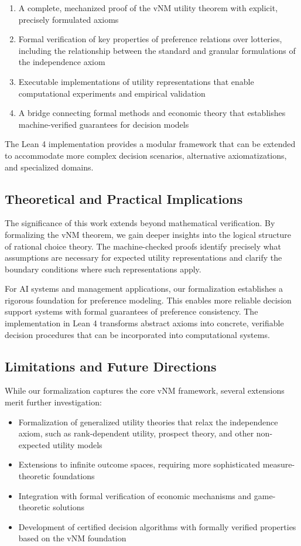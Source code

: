 \documentclass{article}
\theoremstyle{definition}
\begin{document}
\begin{enumerate}
    \item A complete, mechanized proof of the vNM utility theorem with explicit, precisely formulated axioms
    \item Formal verification of key properties of preference relations over lotteries, including the relationship between the standard and granular formulations of the independence axiom
    \item Executable implementations of utility representations that enable computational experiments and empirical validation
    \item A bridge connecting formal methods and economic theory that establishes machine-verified guarantees for decision models
\end{enumerate}

The Lean 4 implementation provides a modular framework that can be extended to accommodate more complex decision scenarios, alternative axiomatizations, and specialized domains.

\subsection{Theoretical and Practical Implications}

The significance of this work extends beyond mathematical verification. By formalizing the vNM theorem, we gain deeper insights into the logical structure of rational choice theory. The machine-checked proofs identify precisely what assumptions are necessary for expected utility representations and clarify the boundary conditions where such representations apply.

For AI systems and management applications, our formalization establishes a rigorous foundation for preference modeling. This enables more reliable decision support systems with formal guarantees of preference consistency. The implementation in Lean 4 transforms abstract axioms into concrete, verifiable decision procedures that can be incorporated into computational systems.

\subsection{Limitations and Future Directions}

While our formalization captures the core vNM framework, several extensions merit further investigation:

\begin{itemize}
    \item Formalization of generalized utility theories that relax the independence axiom, such as rank-dependent utility, prospect theory, and other non-expected utility models
    \item Extensions to infinite outcome spaces, requiring more sophisticated measure-theoretic foundations
    \item Integration with formal verification of economic mechanisms and game-theoretic solutions
    \item Development of certified decision algorithms with formally verified properties based on the vNM foundation
\end{itemize}
\end{document}
